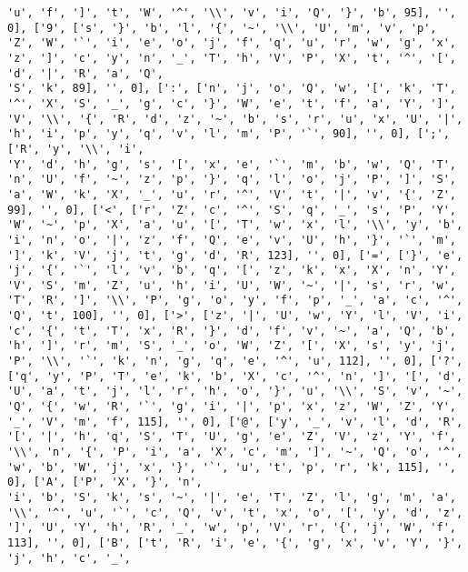 \documentclass{article}
\begin{document}
\begin{verbatim}
'u', 'f', ']', 't', 'W', '^', '\\', 'v', 'i', 'Q', '}', 'b', 95], '', 0], ['9', ['s', '}', 'b', 'l', '{', '~', '\\', 'U', 'm', 'v', 'p', 'Z', 'W', '`', 'i', 'e', 'o', 'j', 'f', 'q', 'u', 'r', 'w', 'g', 'x', 'z', ']', 'c', 'y', 'n', '_', 'T', 'h', 'V', 'P', 'X', 't', '^', '[', 'd', '|', 'R', 'a', 'Q', 
'S', 'k', 89], '', 0], [':', ['n', 'j', 'o', 'Q', 'w', '[', 'k', 'T', '^', 'X', 'S', '_', 'g', 'c', '}', 'W', 'e', 't', 'f', 'a', 'Y', ']', 'V', '\\', '{', 'R', 'd', 'z', '~', 'b', 's', 'r', 'u', 'x', 'U', '|', 'h', 'i', 'p', 'y', 'q', 'v', 'l', 'm', 'P', '`', 90], '', 0], [';', ['R', 'y', '\\', 'i', 
'Y', 'd', 'h', 'g', 's', '[', 'x', 'e', '`', 'm', 'b', 'w', 'Q', 'T', 'n', 'U', 'f', '~', 'z', 'p', '}', 'q', 'l', 'o', 'j', 'P', ']', 'S', 'a', 'W', 'k', 'X', '_', 'u', 'r', '^', 'V', 't', '|', 'v', '{', 'Z', 99], '', 0], ['<', ['r', 'Z', 'c', '^', 'S', 'q', '_', 's', 'P', 'Y', 'W', '~', 'p', 'X', 'a', 'u', '[', 'T', 'w', 'x', 'l', '\\', 'y', 'b', 'i', 'n', 'o', '|', 'z', 'f', 'Q', 'e', 'v', 'U', 'h', '}', '`', 'm', ']', 'k', 'V', 'j', 't', 'g', 'd', 'R', 123], '', 0], ['=', ['}', 'e', 'j', '{', '`', 'l', 'v', 'b', 'q', '[', 'z', 'k', 'x', 'X', 'n', 'Y', 'V', 'S', 'm', 'Z', 'u', 'h', 'i', 'U', 'W', '~', '|', 's', 'r', 'w', 'T', 'R', ']', '\\', 'P', 'g', 'o', 'y', 'f', 'p', '_', 'a', 'c', '^', 'Q', 't', 100], '', 0], ['>', ['z', '|', 'U', 'w', 'Y', 'l', 'V', 'i', 'c', '{', 't', 'T', 'x', 'R', '}', 'd', 'f', 'v', '~', 'a', 'Q', 'b', 'h', ']', 'r', 'm', 'S', '_', 'o', 'W', 'Z', '[', 'X', 's', 'y', 'j', 'P', '\\', '`', 'k', 'n', 'g', 'q', 'e', '^', 'u', 112], '', 0], ['?', ['q', 'y', 'P', 'T', 'e', 'k', 'b', 'X', 'c', '^', 'n', ']', '[', 'd', 'U', 'a', 't', 'j', 'l', 'r', 'h', 'o', '}', 'u', '\\', 'S', 'v', '~', 'Q', '{', 'w', 'R', '`', 'g', 'i', '|', 'p', 'x', 'z', 'W', 'Z', 'Y', '_', 'V', 'm', 'f', 115], '', 0], ['@', ['y', '_', 'v', 'l', 'd', 'R', '[', '|', 'h', 'q', 'S', 'T', 'U', 'g', 'e', 'Z', 'V', 'z', 'Y', 'f', '\\', 'n', '{', 'P', 'i', 'a', 'X', 'c', 'm', ']', '~', 'Q', 'o', '^', 'w', 'b', 'W', 'j', 'x', '}', '`', 'u', 't', 'p', 'r', 'k', 115], '', 0], ['A', ['P', 'X', '}', 'n', 
'i', 'b', 'S', 'k', 's', '~', '|', 'e', 'T', 'Z', 'l', 'g', 'm', 'a', '\\', '^', 'u', '`', 'c', 'Q', 'v', 't', 'x', 'o', '[', 'y', 'd', 'z', ']', 'U', 'Y', 'h', 'R', '_', 'w', 'p', 'V', 'r', '{', 'j', 'W', 'f', 113], '', 0], ['B', ['t', 'R', 'i', 'e', '{', 'g', 'x', 'v', 'Y', '}', 'j', 'h', 'c', '_', 

\end{verbatim}
\end{document}
